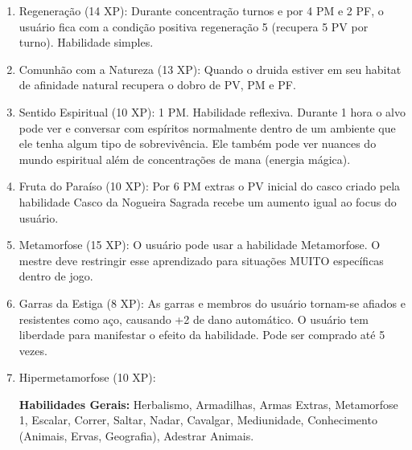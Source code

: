 \begin{enumerate}
    \item Regeneração (14 XP): Durante concentração turnos e por 4 PM e 2 PF, o usuário fica com a condição positiva regeneração 5 (recupera 5 PV por turno). Habilidade simples.

		\item Comunhão com a Natureza (13 XP): Quando o druida estiver em seu habitat de afinidade natural recupera o dobro de PV, PM e PF.  

		\item Sentido Espiritual (10 XP): 1 PM. Habilidade reflexiva.\newline
Durante 1 hora o alvo pode ver e conversar com espíritos normalmente dentro de um ambiente que ele tenha algum tipo de sobrevivência. Ele também pode ver nuances do mundo espiritual além de concentrações de mana (energia mágica). 

			\item Fruta do Paraíso (10 XP): Por 6 PM extras o PV inicial do casco criado pela habilidade Casco da Nogueira Sagrada recebe um aumento igual ao focus do usuário.

		\item Metamorfose (15 XP): O usuário pode usar a habilidade Metamorfose. O mestre deve restringir esse aprendizado para situações MUITO específicas dentro de jogo.

  	\item Garras da Estiga (8 XP): As garras e membros do usuário tornam-se afiados e resistentes como aço, causando +2 de dano automático. O usuário tem liberdade para manifestar o efeito da habilidade. Pode ser comprado até 5 vezes.

		\item Hipermetamorfose (10 XP): %
  
\textbf{Habilidades Gerais:} Herbalismo, Armadilhas, Armas Extras, Metamorfose 1, Escalar, Correr, Saltar, Nadar, Cavalgar, Mediunidade, Conhecimento (Animais, Ervas, Geografia), Adestrar Animais. 
\end{enumerate}

